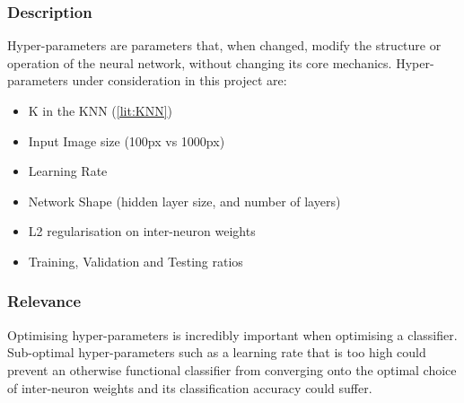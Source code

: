 \subsubsection{Description}
Hyper-parameters are parameters that, when changed, modify the structure or operation of the neural network, without changing its core mechanics. Hyper-parameters under consideration in this project are:
\begin{itemize}
	\item K in the KNN (\ref{lit:KNN})
	\item Input Image size (100px vs 1000px)
	\item Learning Rate
	\item Network Shape (hidden layer size, and number of layers)
	\item L2 regularisation on inter-neuron weights
	\item Training, Validation and Testing ratios
\end{itemize}
\subsubsection{Relevance}
Optimising hyper-parameters is incredibly important when optimising a classifier. Sub-optimal hyper-parameters such as a learning rate that is too high could prevent an otherwise functional classifier from converging onto the optimal choice of inter-neuron weights and its classification accuracy could suffer. 

%
%
%

